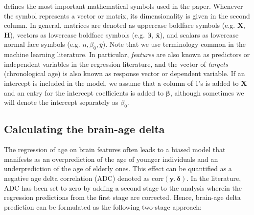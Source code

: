 \documentclass[utf8]{frontiersSCNS} %
\renewcommand{\b}{\boldsymbol{\beta}} %
\newcommand{\corr}{\text{corr}}
\renewcommand{\d}{\boldsymbol{\delta}}
\newcommand{\e}{\mathbf{e}}
\renewcommand{\H}{\mathbf{H}}
\newcommand{\mx}{\mathbf{\bar{x}}}
\newcommand{\my}{\bar{y}}
\newcommand{\one}{\mathbf{1}}
\newcommand{\R}{\mathbb{R}}
\newcommand{\X}{\mathbf{X}}
\newcommand{\y}{\mathbf{y}}
\newcommand{\yh}{\mathbf{\hat{y}}}
\begin{document}
 defines the most important mathematical symbols used in the paper. Whenever the symbol represents a vector or matrix, its dimensionality is given in the second column. In general,  matrices are denoted as uppercase boldface symbols (e.g. $\X$, $\H$), vectors as lowercase boldface symbols (e.g. $\b$, $\mx$), and scalars as lowercase normal face symbols (e.g. $n, \beta_0, \my$). Note that we use terminology common in the machine learning literature. In particular, \textit{features} are also known as predictors or independent variables in the regression literature, and the vector of \textit{targets} (chronological age) is also known as response vector or dependent variable. 
If an intercept is included in the model, we assume that a column of 1's is added to $\X$ and an entry for the intercept coefficients is added to $\b$, although sometimes we will denote the intercept separately as $\beta_0$.


\subsection{Calculating the brain-age delta}\label{sec:current_approaches}

The regression of age on brain features often leads to a biased model that manifests as an overprediction of the age of younger individuals and an underprediction of the age of elderly ones. This effect can be quantified as a negative age delta correlation (ADC) denoted as $\corr(\y,\d)$. In the literature, ADC has been set to zero by adding a second stage to the analysis wherein the regression predictions from the first stage are corrected. Hence, brain-age delta prediction can be formulated as the following two-stage approach:
\end{document}
